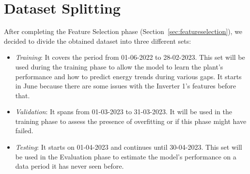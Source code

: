 \section{Dataset Splitting}\label{sec:datasetsplitting}
After completing the Feature Selection phase (Section~\ref{sec:featureselection}),
we decided to divide the obtained
dataset into three different sets:


\begin{itemize}
	\item \textit{Training}: It covers the period from 01-06-2022 to
	      28-02-2023. This set will be used during the training phase
	      to allow the model to learn the plant's performance and how
	      to predict energy trends during various gaps.
	      It starts in June because there are some issues with the
	      Inverter 1's features before that.

	\item \textit{Validation}: It spans from 01-03-2023 to 31-03-2023.
	      It will be used in the training phase to assess the presence
	      of overfitting or if this phase might have failed.

	\item \textit{Testing}: It starts on 01-04-2023 and continues
	      until 30-04-2023. This set will be used in the Evaluation phase
	      to estimate the model's performance on a data period it has
	      never seen before.

\end{itemize}

